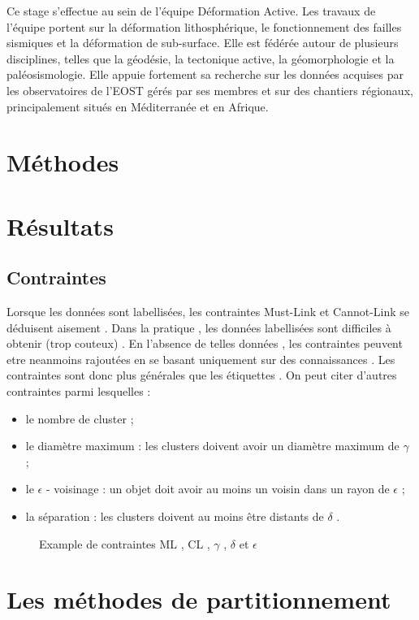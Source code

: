 \documentclass[11pt, openany]{report}
\begin{document}
Ce stage s'effectue au sein de l'équipe Déformation Active. Les travaux de l'équipe portent sur la déformation lithosphérique, le fonctionnement des failles sismiques et la déformation de sub-surface. Elle est fédérée autour de plusieurs disciplines, telles que la géodésie, la tectonique active, la géomorphologie et la paléosismologie. Elle appuie fortement sa recherche sur les données acquises par les observatoires de l'EOST gérés par ses membres et sur des chantiers régionaux, principalement situés en Méditerranée et en Afrique.

\chapter{Méthodes}
\chapter{Résultats}



\section{Contraintes}


Lorsque les données sont labellisées, les contraintes Must-Link et Cannot-Link se déduisent aisement .
Dans la pratique , les données labellisées sont difficiles à obtenir (trop couteux) . En l'absence de telles données ,  les contraintes peuvent etre neanmoins rajoutées en se basant uniquement sur des connaissances . Les contraintes sont donc plus générales que les étiquettes .
\newpage
On peut citer d'autres contraintes parmi lesquelles :
\begin{itemize}
  \item le nombre de cluster  ; 
   \item le diamètre maximum : les clusters doivent avoir un diamètre maximum de $\gamma$ ;
    \item  le $\epsilon$ - voisinage  :  un objet doit avoir au moins un voisin dans un rayon de $\epsilon$ ;
     \item la séparation : les clusters doivent au moins être distants de $\delta$ .
\end{itemize}

\begin{figure}[h!]
  \centering
  \caption{Example de contraintes ML , CL , $\gamma$ , $\delta$ et $\epsilon$}
  \label{fig:contraintes}
\end{figure}

\chapter{Les méthodes de partitionnement} 
\end{document}
